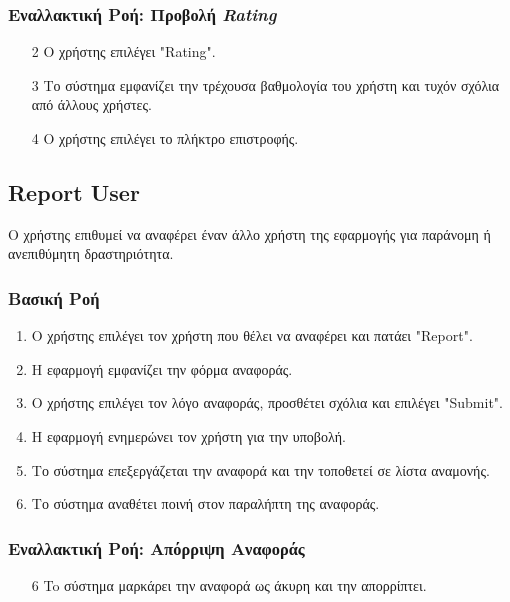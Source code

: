 \subsubsection{Εναλλακτική Ροή: Προβολή \textit{Rating}}

\begin{enumerate}
    \item[2] Ο χρήστης επιλέγει "Rating".
    \item[3] Το σύστημα εμφανίζει την τρέχουσα βαθμολογία του χρήστη και τυχόν
        σχόλια από άλλους χρήστες.
    \item[4] Ο χρήστης επιλέγει το πλήκτρο επιστροφής.
\end{enumerate}

\newpage

\subsection{Report User}
\label{uc:report-user}

Ο χρήστης επιθυμεί να αναφέρει έναν άλλο χρήστη της εφαρμογής για
παράνομη ή ανεπιθύμητη δραστηριότητα.

\subsubsection{Βασική Ροή}

\begin{enumerate}
    \item Ο χρήστης επιλέγει τον χρήστη που θέλει να αναφέρει και πατάει "Report".
    \item H εφαρμογή εμφανίζει την φόρμα αναφοράς.
    \item Ο χρήστης επιλέγει τον λόγο αναφοράς, προσθέτει σχόλια και επιλέγει "Submit".
    \item Η εφαρμογή ενημερώνει τον χρήστη για την υποβολή.
    \item Το σύστημα επεξεργάζεται την αναφορά και την τοποθετεί σε λίστα αναμονής.
    \item Το σύστημα αναθέτει ποινή στον παραλήπτη της αναφοράς.
\end{enumerate}

\subsubsection{Εναλλακτική Ροή: Απόρριψη Αναφοράς}

\begin{enumerate}
    \item[6] To σύστημα μαρκάρει την αναφορά ως άκυρη και την απορρίπτει.
\end{enumerate}

